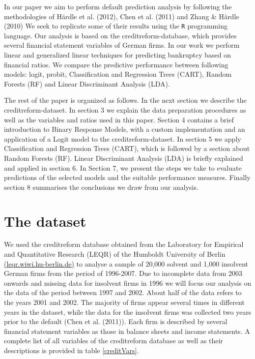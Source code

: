 \documentclass{article}
\begin{document}
In our paper we aim to perform default prediction analysis by following the methodologies of H{\"a}rdle et al. (2012), Chen et al. (2011) and Zhang \& H{\"a}rdle (2010) We seek to replicate some of their results using the \texttt{R} programming language. Our analysis is based on the creditreform-database, which provides several 
financial statement variables of German firms. In our work we perform linear and generalized linear techniques for predicting bankruptcy based on financial ratios. We compare the predictive performance between following models: logit, probit, Classification and Regression Trees (CART), Random Forests (RF) and Linear Discriminant Analysis (LDA). 

The rest of the paper is organized as follows. In the next section we describe the creditreform-dataset. In section 3 we explain the data preparation procedures as well as the variables and ratios used in this paper. Section 4 contains a brief introduction to Binary Response Models, with a custom implementation and an application of a Logit model to the creditreform-dataset. In section 5 we apply Classification and Regression Trees (CART), which is followed by a section about Random Forests (RF). Linear Discriminant Analysis (LDA) is briefly explained and applied in section 6. In Section 7, we present the steps we take to evaluate predictions of the selected models and the suitable performance measures. Finally section 8 summarises the conclusions we draw from our analysis.

\section{The dataset}

We used the creditreform database obtained from the Laboratory for Empirical and Quantitative Research (LEQR) of the Humboldt University of Berlin \href{https://leqr.wiwi.hu-berlin.de/leqr/content/databaseInformation/creditreform/creditreform.htm}{(leqr.wiwi.hu-berlin.de)} to analyse a sample of 20,000 solvent and 1,000 insolvent German firms from the period of 1996-2007. Due to incomplete data from 2003 onwards and missing data for insolvent firms in 1996 we will focus our analysis on the data of the period between 1997 and 2002. About half of the data refers to the years 2001 and 2002. The majority of firms appear several times in different years in the dataset, while the data for the insolvent firms was collected two years prior to the default (Chen et al. (2011)). Each firm is described by several financial statement variables as those in balance sheets and income statements. A complete list of all variables of the creditreform database as well as their descriptions is provided in table \ref{creditVars}. 
\end{document}

